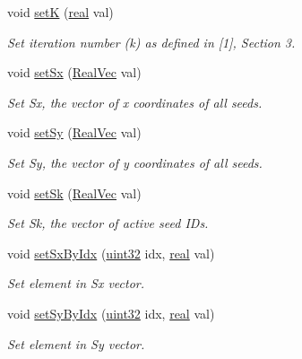 \begin{DoxyCompactItemize}
void \mbox{\hyperlink{classvd_a7c692a97b49c4596c4ec1bc0a129b516}{setK}} (\mbox{\hyperlink{typedefs_8h_a58a0c7cf2501f4492da833421be92547}{real}} val)
\begin{DoxyCompactList}\small\item\em Set iteration number (k) as defined in \mbox{[}1\mbox{]}, Section 3. \end{DoxyCompactList}\item 
void \mbox{\hyperlink{classvd_af83b298bdb5fcc3dd0b87bb8ed68e4a1}{set\+Sx}} (\mbox{\hyperlink{typedefs_8h_a84b6d9a0fbb45e01ad4a3aa5667f2992}{Real\+Vec}} val)
\begin{DoxyCompactList}\small\item\em Set Sx, the vector of x coordinates of all seeds. \end{DoxyCompactList}\item 
void \mbox{\hyperlink{classvd_a04c6f1cda87a3d18d8dfd67b9bf5f843}{set\+Sy}} (\mbox{\hyperlink{typedefs_8h_a84b6d9a0fbb45e01ad4a3aa5667f2992}{Real\+Vec}} val)
\begin{DoxyCompactList}\small\item\em Set Sy, the vector of y coordinates of all seeds. \end{DoxyCompactList}\item 
void \mbox{\hyperlink{classvd_af12cf5f79bb162b5ac163fd666498c30}{set\+Sk}} (\mbox{\hyperlink{typedefs_8h_a84b6d9a0fbb45e01ad4a3aa5667f2992}{Real\+Vec}} val)
\begin{DoxyCompactList}\small\item\em Set Sk, the vector of active seed I\+Ds. \end{DoxyCompactList}\item 
void \mbox{\hyperlink{classvd_a440d47d94f489ceefa9037be51daef66}{set\+Sx\+By\+Idx}} (\mbox{\hyperlink{typedefs_8h_a8ad23e2333787a214e20a58a284a5a60}{uint32}} idx, \mbox{\hyperlink{typedefs_8h_a58a0c7cf2501f4492da833421be92547}{real}} val)
\begin{DoxyCompactList}\small\item\em Set element in Sx vector. \end{DoxyCompactList}\item 
void \mbox{\hyperlink{classvd_a5407f9c20ed4ff2300ccbebb999d1dde}{set\+Sy\+By\+Idx}} (\mbox{\hyperlink{typedefs_8h_a8ad23e2333787a214e20a58a284a5a60}{uint32}} idx, \mbox{\hyperlink{typedefs_8h_a58a0c7cf2501f4492da833421be92547}{real}} val)
\begin{DoxyCompactList}\small\item\em Set element in Sy vector. \end{DoxyCompactList}\item 

\end{DoxyCompactItemize}
